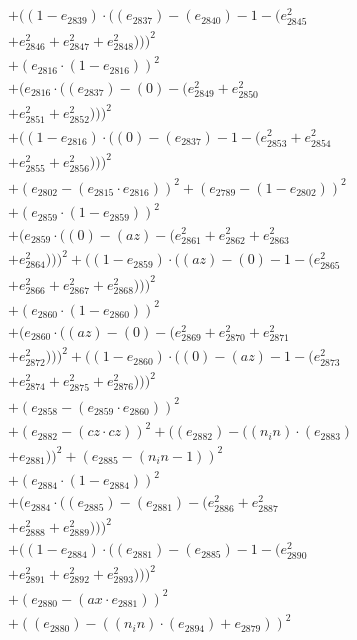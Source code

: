 \documentclass[10pt, a4paper]{article}
\begin{document}
\begin{align*}
& + ((1 - e_{2839})  \cdot  ((e_{2837}) - (e_{2840}) - 1 - (e_{2845}^{2} \\
& + e_{2846}^{2} + e_{2847}^{2} + e_{2848}^{2})))^{2} \\
& + (e_{2816}  \cdot  (1 - e_{2816}))^{2} \\
& + (e_{2816}  \cdot  ((e_{2837}) - (0) - (e_{2849}^{2} + e_{2850}^{2} \\
& + e_{2851}^{2} + e_{2852}^{2})))^{2} \\
& + ((1 - e_{2816})  \cdot  ((0) - (e_{2837}) - 1 - (e_{2853}^{2} + e_{2854}^{2} \\
& + e_{2855}^{2} + e_{2856}^{2})))^{2} \\
& + (e_{2802} - (e_{2815}  \cdot  e_{2816}))^{2} + (e_{2789} - (1 - e_{2802}))^{2} \\
& + (e_{2859}  \cdot  (1 - e_{2859}))^{2} \\
& + (e_{2859}  \cdot  ((0) - (az) - (e_{2861}^{2} + e_{2862}^{2} + e_{2863}^{2} \\
& + e_{2864}^{2})))^{2} + ((1 - e_{2859})  \cdot  ((az) - (0) - 1 - (e_{2865}^{2} \\
& + e_{2866}^{2} + e_{2867}^{2} + e_{2868}^{2})))^{2} \\
& + (e_{2860}  \cdot  (1 - e_{2860}))^{2} \\
& + (e_{2860}  \cdot  ((az) - (0) - (e_{2869}^{2} + e_{2870}^{2} + e_{2871}^{2} \\
& + e_{2872}^{2})))^{2} + ((1 - e_{2860})  \cdot  ((0) - (az) - 1 - (e_{2873}^{2} \\
& + e_{2874}^{2} + e_{2875}^{2} + e_{2876}^{2})))^{2} \\
& + (e_{2858} - (e_{2859}  \cdot  e_{2860}))^{2} \\
& + (e_{2882} - (cz  \cdot  cz))^{2} + ((e_{2882}) - ((n_in)  \cdot  (e_{2883}) \\
& + e_{2881}))^{2} + (e_{2885} - (n_in - 1))^{2} \\
& + (e_{2884}  \cdot  (1 - e_{2884}))^{2} \\
& + (e_{2884}  \cdot  ((e_{2885}) - (e_{2881}) - (e_{2886}^{2} + e_{2887}^{2} \\
& + e_{2888}^{2} + e_{2889}^{2})))^{2} \\
& + ((1 - e_{2884})  \cdot  ((e_{2881}) - (e_{2885}) - 1 - (e_{2890}^{2} \\
& + e_{2891}^{2} + e_{2892}^{2} + e_{2893}^{2})))^{2} \\
& + (e_{2880} - (ax  \cdot  e_{2881}))^{2} \\
& + ((e_{2880}) - ((n_in)  \cdot  (e_{2894}) + e_{2879}))^{2} \\

\end{align*}
\end{document}
